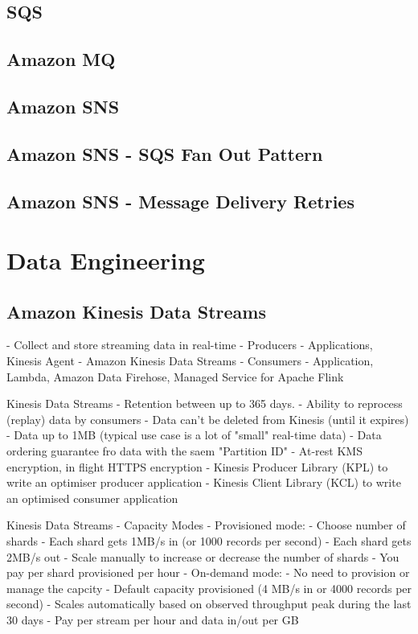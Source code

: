 \documentclass[11pt]{book}
\begin{document}
    \section{SQS}


    \section{Amazon MQ}


    \section{Amazon SNS}


    \section{Amazon SNS - SQS Fan Out Pattern}


    \section{Amazon SNS - Message Delivery Retries}


    \chapter{Data Engineering}

    \section{Amazon Kinesis Data Streams}
    - Collect and store streaming data in real-time
        - Producers - Applications, Kinesis Agent
        - Amazon Kinesis Data Streams
        - Consumers - Application, Lambda, Amazon Data Firehose, Managed Service for Apache Flink

    Kinesis Data Streams
    - Retention between up to 365 days.
    - Ability to reprocess (replay) data by consumers
    - Data can't be deleted from Kinesis (until it expires)
    - Data up to 1MB (typical use case is a lot of "small" real-time data)
    - Data ordering guarantee fro data with the saem "Partition ID"
    - At-rest KMS encryption, in flight HTTPS encryption
    - Kinesis Producer Library (KPL) to write an optimiser producer application
    - Kinesis Client Library (KCL) to write an optimised consumer application

    Kinesis Data Streams - Capacity Modes
    - Provisioned mode:
        - Choose number of shards
        - Each shard gets 1MB/s in (or 1000 records per second)
        - Each shard gets 2MB/s out
        - Scale manually to increase or decrease the number of shards
        - You pay per shard provisioned per hour
    - On-demand mode:
        - No need to provision or manage the capcity
        - Default capacity provisioned (4 MB/s in or 4000 records per second)
        - Scales automatically based on observed throughput peak during the last 30 days
        - Pay per stream per hour and data in/out per GB
\end{document}
